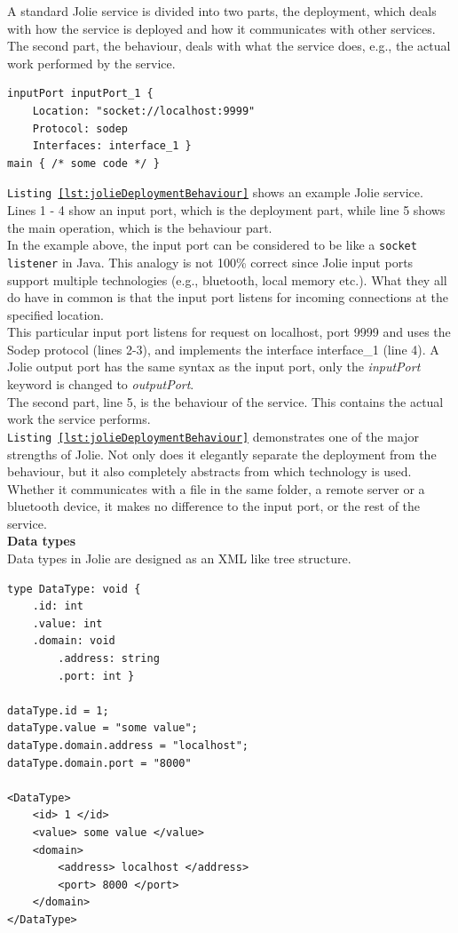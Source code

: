 \documentclass[12pt,a4paper]{article}
\begin{document}
A standard Jolie service is divided into two parts, the deployment, which deals with how the service is deployed and how it communicates with other services. The second part, the behaviour, deals with what the service does, e.g., the actual work performed by the service.

\begin{lstlisting}[caption={Separation of deployment and behahaviour in Jolie},label={lst:jolieDeploymentBehaviour}]
inputPort inputPort_1 {
	Location: "socket://localhost:9999"
	Protocol: sodep
	Interfaces: interface_1 }
main { /* some code */ }
\end{lstlisting}

\texttt{Listing \ref{lst:jolieDeploymentBehaviour}} shows an example Jolie service. Lines 1 - 4 show an input port, which is the deployment part, while line 5 shows the main operation, which is the behaviour part. \\
In the example above, the input port can be considered to be like a \texttt{socket listener} \cite{java_socket_listener} in Java. This analogy is not 100\% correct since Jolie input ports support multiple technologies (e.g., bluetooth, local memory etc.). What they all do have in common is that the input port listens for incoming connections at the specified location. \\
This particular input port listens for request on localhost, port 9999 and uses the Sodep\cite{jolie_protocols} protocol (lines 2-3), and implements the interface interface\_1 (line 4). A Jolie output port has the same syntax as the input port, only the \emph{inputPort} keyword is changed to \emph{outputPort}. \\
The second part, line 5, is the behaviour of the service. This contains the actual work the service performs. \\
\texttt{Listing \ref{lst:jolieDeploymentBehaviour}} demonstrates one of the major strengths of Jolie. Not only does it elegantly separate the deployment from the behaviour, but it also completely abstracts from which technology is used. Whether it communicates with a file in the same folder, a remote server or a bluetooth device, it makes no difference to the input port, or the rest of the service.\\ 

\textbf{Data types} \\
Data types in Jolie are designed as an XML like tree structure. \\
\begin{lstlisting}[caption={Jolie data types},label={lst:jolieDataTypes}]
type DataType: void {
	.id: int
	.value: int
	.domain: void
		.address: string
		.port: int }
		
dataType.id = 1;
dataType.value = "some value";
dataType.domain.address = "localhost";
dataType.domain.port = "8000"

<DataType>
	<id> 1 </id>
	<value> some value </value>
	<domain>
		<address> localhost </address>
		<port> 8000 </port>
	</domain>
</DataType>
\end{lstlisting}
\end{document}
